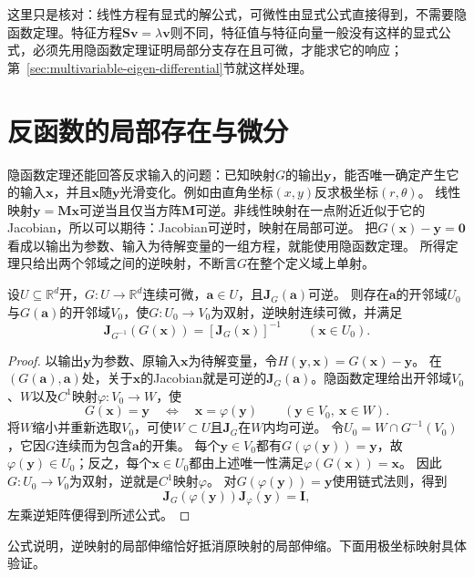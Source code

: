 这里只是核对：线性方程有显式的解公式，可微性由显式公式直接得到，不需要隐函数定理。特征方程$\bm S\bm v=\lambda\bm v$则不同，特征值与特征向量一般没有这样的显式公式，必须先用隐函数定理证明局部分支存在且可微，才能求它的响应；第~\ref{sec:multivariable-eigen-differential}节就这样处理。

\section{反函数的局部存在与微分}
\label{sec:multivariable-inverse-function}

隐函数定理还能回答反求输入的问题：已知映射$G$的输出$\bm y$，能否唯一确定产生它的输入$\bm x$，并且$\bm x$随$\bm y$光滑变化。例如由直角坐标$(x,y)$反求极坐标$(r,\theta)$。
线性映射$\bm y=\bm M\bm x$可逆当且仅当方阵$\bm M$可逆。非线性映射在一点附近近似于它的Jacobian，所以可以期待：Jacobian可逆时，映射在局部可逆。
把$G(\bm x)-\bm y=\bm 0$看成以输出为参数、输入为待解变量的一组方程，就能使用隐函数定理。
所得定理只给出两个邻域之间的逆映射，不断言$G$在整个定义域上单射。
\begin{theorem}[局部反函数定理]
\label{thm:multivariable-inverse-function}
设$U\subseteq\mathbb R^d$开，$G:U\to\mathbb R^d$连续可微，$\bm a\in U$，且$\bm J_G(\bm a)$可逆。
则存在$\bm a$的开邻域$U_0$与$G(\bm a)$的开邻域$V_0$，使$G:U_0\to V_0$为双射，逆映射连续可微，并满足
\begin{equation}
 \bm J_{G^{-1}}(G(\bm x))=[\bm J_G(\bm x)]^{-1}
 \qquad(\bm x\in U_0).
\label{eq:multivariable-inverse-function-jacobian}
\end{equation}
\end{theorem}
\begin{proof}
以输出$\bm y$为参数、原输入$\bm x$为待解变量，令$H(\bm y,\bm x)=G(\bm x)-\bm y$。
在$(G(\bm a),\bm a)$处，关于$\bm x$的Jacobian就是可逆的$\bm J_G(\bm a)$。隐函数定理给出开邻域$V_0$、$W$以及$C^1$映射$\varphi:V_0\to W$，使
\[
 G(\bm x)=\bm y\quad\Longleftrightarrow\quad\bm x=\varphi(\bm y)
 \qquad(\bm y\in V_0,\ \bm x\in W).
\]
将$W$缩小并重新选取$V_0$，可使$W\subset U$且$\bm J_G$在$W$内均可逆。
令$U_0=W\cap G^{-1}(V_0)$，它因$G$连续而为包含$\bm a$的开集。
每个$\bm y\in V_0$都有$G(\varphi(\bm y))=\bm y$，故$\varphi(\bm y)\in U_0$；反之，每个$\bm x\in U_0$都由上述唯一性满足$\varphi(G(\bm x))=\bm x$。
因此$G:U_0\to V_0$为双射，逆就是$C^1$映射$\varphi$。
对$G(\varphi(\bm y))=\bm y$使用链式法则，得到
\[
 \bm J_G(\varphi(\bm y))\bm J_\varphi(\bm y)=\bm I,
\]
左乘逆矩阵便得到所述公式。
\end{proof}
公式说明，逆映射的局部伸缩恰好抵消原映射的局部伸缩。下面用极坐标映射具体验证。
